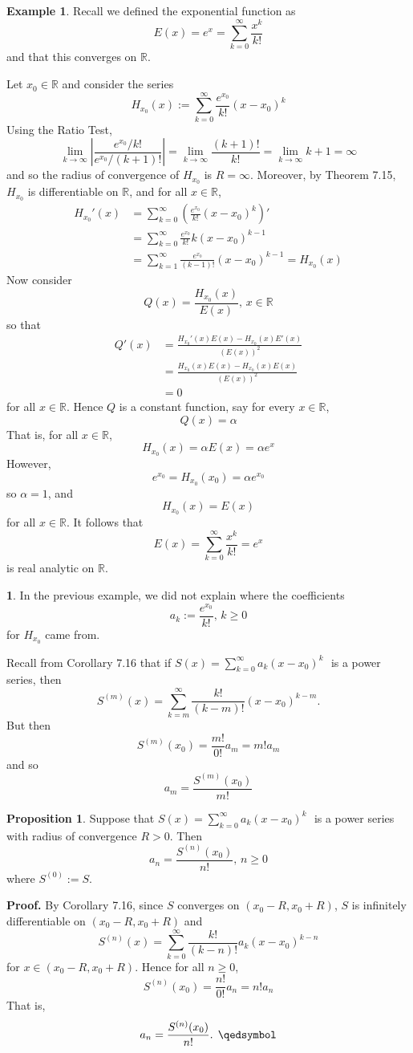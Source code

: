 \documentclass[11pt]{article}
\theoremstyle{definition}
\newtheorem{exmp}[thm]{Example}
\newtheorem{prop}[thm]{Proposition}
\newtheorem{none}[thm]{}
\newcommand{\mbR}{\ensuremath{\mathbb{R}}}
\newcommand{\powerseries}{\ensuremath{S(x) = \sum_{k=0}^\infty a_k (x - x_0)^k \text{ }}}
\begin{document}
\begin{exmp}
Recall we defined the exponential function as
$$E(x) = e^x = \sum_{k=0}^\infty \frac{x^k}{k!}$$
and that this converges on $\mbR$.

Let $x_0 \in \mbR$ and consider the series
$$H_{x_0}(x) := \sum_{k=0}^\infty \frac{e^{x_0}}{k!} (x - x_0)^k$$
Using the Ratio Test,
$$\lim_{k\to\infty} \left| \frac{e^{x_0} / k!}{e^{x_0} / (k+1)!} \right| = \lim_{k\to\infty} \frac{(k+1)!}{k!} = \lim_{k\to\infty} k+1 = \infty$$
and so the radius of convergence of $H_{x_0}$ is $R = \infty$. Moreover, by Theorem 7.15, $H_{x_0}$ is differentiable on $\mbR$, and for all $x \in \mbR$,
\begin{align*}
H_{x_0}'(x) & = \sum_{k=0}^\infty \left( \frac{e^{x_0}}{k!} (x - x_0)^k \right)' \\
& = \sum_{k=0}^\infty \frac{e^{x_0}}{k!} k(x - x_0)^{k-1} \\
& = \sum_{k=1}^\infty \frac{e^{x_0}}{(k-1)!} (x - x_0)^{k-1} = H_{x_0}(x)
\end{align*}
Now consider
$$Q(x) = \frac{H_{x_0}(x)}{E(x)}, \, x \in \mbR$$
so that
\begin{align*}
Q'(x) & = \frac{H_{x_0}'(x) E(x) - H_{x_0}(x) E'(x)}{\left(E(x)\right)^2} \\
& = \frac{H_{x_0}(x) E(x) - H_{x_0} (x) E(x)}{\left(E(x)\right)^2} \\
& = 0
\end{align*}
for all $x \in \mbR$. Hence $Q$ is a constant function, say for every $x \in \mbR$,
$$Q(x) = \alpha$$
That is, for all $x \in \mbR$,
$$H_{x_0}(x) = \alpha E(x) = \alpha e^x$$
However,
$$e^{x_0} = H_{x_0}(x_0) = \alpha e^{x_0}$$
so $\alpha = 1$, and
$$H_{x_0}(x) = E(x)$$
for all $x \in \mbR$. It follows that 
$$E(x) = \sum_{k=0}^\infty \frac{x^k}{k!} = e^x$$
is real analytic on $\mbR$.
\end{exmp}

\begin{none}
In the previous example, we did not explain where the coefficients
$$a_k := \frac{e^{x_0}}{k!}, \, k \geq 0$$
for $H_{x_0}$ came from. 

Recall from Corollary 7.16 that if \powerseries is a power series, then 
$$S^{(m)}(x) = \sum_{k=m}^\infty \frac{k!}{(k-m)!} (x - x_0)^{k-m}.$$
But then
$$S^{(m)}(x_0) = \frac{m!}{0!} a_m = m!a_m$$
and so
$$a_m = \frac{S^{(m)}(x_0)}{m!}$$
\end{none}

\begin{prop}
Suppose that \powerseries is a power series with radius of convergence $R > 0$. Then
$$a_n = \frac{S^{(n)}(x_0)}{n!}, \, n \geq 0$$
where $S^{(0)} := S$.
\end{prop}
\textbf{Proof.} By Corollary 7.16, since $S$ converges on $(x_0 - R, x_0 + R)$, $S$ is infinitely differentiable on $(x_0 - R, x_0 + R)$ and
$$S^{(n)}(x) = \sum_{k=0}^\infty \frac{k!}{(k-n)!} a_k (x-x_0)^{k-n}$$
for $x \in (x_0 - R, x_0 + R)$. Hence for all $n \geq 0$,
$$S^{(n)}(x_0) = \frac{n!}{0!} a_n = n!a_n$$
That is,
$$a_n = \frac{S^{(n)}(x_0)}{n!} \text{. } \qedsymbol$$
\end{document}
